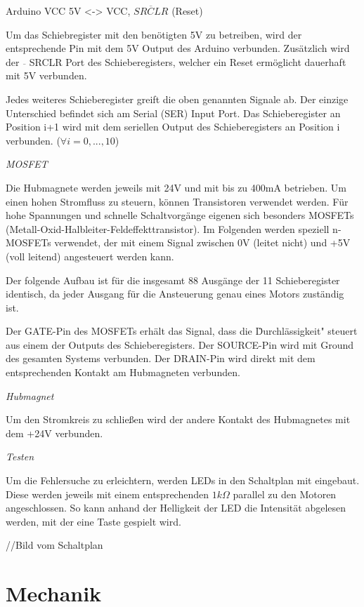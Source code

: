 Arduino VCC 5V <-> VCC, $\overline{SRCLR}$ (Reset)

Um das Schiebregister mit den benötigten 5V zu betreiben, wird der entsprechende Pin mit dem 5V Output des Arduino verbunden.
Zusätzlich wird der $\overline{ }$ SRCLR Port des Schieberegisters, welcher ein Reset ermöglicht dauerhaft mit 5V verbunden.

Jedes weiteres Schieberegister greift die oben genannten Signale ab.
Der einzige Unterschied befindet sich am Serial (SER) Input Port.
Das Schieberegister an Position i+1 wird mit dem seriellen Output des Schieberegisters an Position i verbunden. ($\forall i = 0,...,10$)

\textit{MOSFET}

Die Hubmagnete werden jeweils mit 24V und mit bis zu 400mA betrieben.
Um einen hohen Stromfluss zu steuern, können Transistoren verwendet werden.
Für hohe Spannungen und schnelle Schaltvorgänge eigenen sich besonders MOSFETs (Metall-Oxid-Halbleiter-Feldeffekttransistor).
Im Folgenden werden speziell n-MOSFETs verwendet, der mit einem Signal zwischen 0V (leitet nicht) und +5V (voll leitend) angesteuert werden kann.

Der folgende Aufbau ist für die insgesamt 88 Ausgänge der 11 Schieberegister identisch, da jeder Ausgang für die Ansteuerung genau eines Motors zuständig ist.

Der GATE-Pin des MOSFETs erhält das Signal, dass die \"Durchlässigkeit" steuert aus einem der Outputs des Schieberegisters.
Der SOURCE-Pin wird mit Ground des gesamten Systems verbunden.
Der DRAIN-Pin wird direkt mit dem entsprechenden Kontakt am Hubmagneten verbunden.

\textit{Hubmagnet}

Um den Stromkreis zu schließen wird der andere Kontakt des Hubmagnetes mit dem +24V verbunden.

\textit{Testen}

Um die Fehlersuche zu erleichtern, werden LEDs in den Schaltplan mit eingebaut.
Diese werden jeweils mit einem entsprechenden $1k\Omega$ parallel zu den Motoren angeschlossen.
So kann anhand der Helligkeit der LED die Intensität abgelesen werden, mit der eine Taste gespielt wird.

//Bild vom Schaltplan

\section{Mechanik}\label{vorgehenHW}

